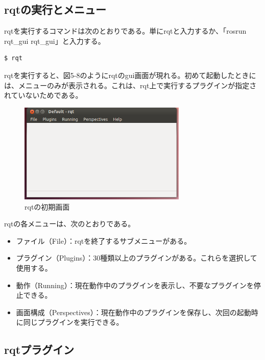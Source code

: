 \subsection{rqtの実行とメニュー}

rqtを実行するコマンドは次のとおりである。単にrqtと入力するか、「rosrun rqt\_gui rqt\_gui」と入力する。

\begin{lstlisting}[language=ROS]
$ rqt
\end{lstlisting}

rqtを実行すると、図5-8のようにrqtのgui画面が現れる。初めて起動したときには、メニューのみが表示される。これは、rqt上で実行するプラグインが指定されていないためである。

\begin{figure}[h]
  \centering
  \includegraphics[width=8cm]{pictures/chapter5/pic_05_08.png}
  \caption{rqtの初期画面}
\end{figure}

rqtの各メニューは、次のとおりである。

\begin{itemize}
\item ファイル（File）：rqtを終了するサブメニューがある。
\item プラグイン（Plugins）：30種類以上のプラグインがある。これらを選択して使用する。
\item 動作（Running）：現在動作中のプラグインを表示し、不要なプラグインを停止できる。
\item 画面構成（Perspectives）：現在動作中のプラグインを保存し、次回の起動時に同じプラグインを実行できる。
\end{itemize}

\subsection{rqtプラグイン}

